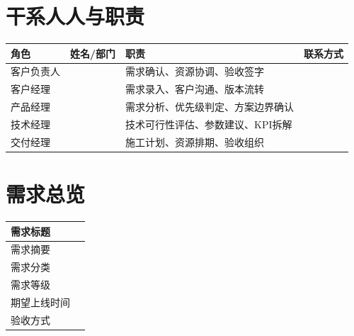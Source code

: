 \documentclass[12pt,a4paper]{ctexart}
\begin{document}
\section{干系人人与职责}

\begin{tabularx}{\textwidth}{|P{3.2cm}|P{3.0cm}|Y|P{3.0cm}|}
\hline
角色 & 姓名/部门 & 职责 & 联系方式 \\
\hline
客户负责人 & %
 & 需求确认、资源协调、验收签字 & %
 \\ \hline
客户经理 & %
 & 需求录入、客户沟通、版本流转 & %
 \\ \hline
产品经理 & %
 & 需求分析、优先级判定、方案边界确认 & %
 \\ \hline
技术经理 & %
 & 技术可行性评估、参数建议、KPI拆解 & %
 \\ \hline
交付经理 & %
 & 施工计划、资源排期、验收组织 & %
 \\ \hline
\end{tabularx}

\section{需求总览}

\begin{tabularx}{\textwidth}{|P{3.2cm}|Y|}
\hline
需求标题 & %
 \\ \hline
需求摘要 & %
 \\ \hline
需求分类 & %
 \\ \hline
需求等级 & %
 \\ \hline
期望上线时间 & %
 \\ \hline
验收方式 & %
 \\ \hline
\end{tabularx}
\end{document}

